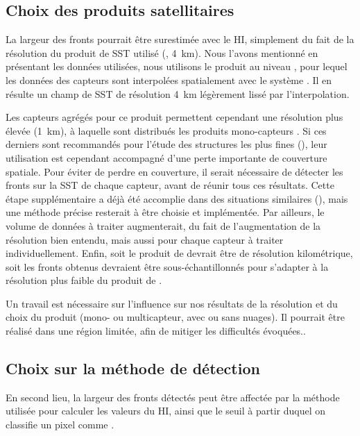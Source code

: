 \subsection{Choix des produits satellitaires}

La largeur des fronts pourrait être surestimée avec le HI, simplement du fait de la résolution du produit de SST utilisé (, \qty{4}{\km}).
Nous l'avons mentionné en présentant les données utilisées, nous utilisons le produit  au niveau , pour lequel les données des capteurs sont interpolées spatialement avec le système .
Il en résulte un champ de SST de résolution \qty{4}{\km} légèrement lissé par l'interpolation.

Les capteurs agrégés pour ce produit permettent cependant une résolution plus élevée (\qty{1}{\km}), à laquelle sont distribués les produits mono-capteurs .
Si ces derniers sont recommandés pour l'étude des structures les plus fines (\cite{merchant_2019}), leur utilisation est cependant accompagné d'une perte importante de couverture spatiale.
Pour éviter de perdre en couverture, il serait nécessaire de détecter les fronts sur la SST de chaque capteur, avant de réunir tous ces résultats.
Cette étape supplémentaire a déjà été accomplie dans des situations similaires (\cite{miller_2009,nieto_2012}), mais une méthode précise resterait à être choisie et implémentée.
Par ailleurs, le volume de données à traiter augmenterait, du fait de l'augmentation de la résolution bien entendu, mais aussi pour chaque capteur à traiter individuellement.
Enfin, soit le produit de  devrait être de résolution kilométrique, soit les fronts obtenus devraient être sous-échantillonnés pour s'adapter à la résolution plus faible du produit de .

Un travail est nécessaire sur l'influence sur nos résultats de la résolution et du choix du produit (mono- ou multicapteur, avec ou sans nuages).
Il pourrait être réalisé dans une région limitée, afin de mitiger les difficultés évoquées..

\subsection{Choix sur la méthode de détection}

En second lieu, la largeur des fronts détectés peut être affectée par la méthode utilisée pour calculer les valeurs du HI, ainsi que le seuil à partir duquel on classifie un pixel comme .

